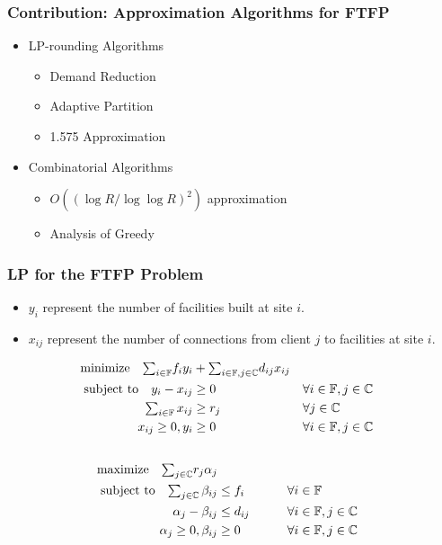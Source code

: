 \documentclass[handout, hyperref, xcolor=dvipsnames]{beamer}
\begin{document}
\begin{frame}
  \frametitle{Contribution: Approximation Algorithms for FTFP}

  \begin{itemize}
  \item LP-rounding Algorithms
    \begin{itemize}
    \item Demand Reduction
    \item Adaptive Partition
    \item 1.575 Approximation
    \end{itemize}
  \item Combinatorial Algorithms
    \begin{itemize}
    \item $O((\log R / \log\log R)^2)$ approximation
    \item Analysis of Greedy
    \end{itemize}
  \end{itemize}
\end{frame}

\begin{frame}
  \frametitle{LP for the FTFP Problem}
  \begin{itemize}
  \item $y_i$ represent the number of facilities built at site $i$.
  \item $x_{ij}$ represent the number of connections from client $j$
    to facilities at site $i$.
  \end{itemize}
  \begin{alignat}{3}
    \notag
    \textrm{minimize}\quad \textstyle{\sum_{i\in \mathbb{F}}}f_iy_i &+ \textstyle{\sum_{i\in \mathbb{F}, j\in \mathbb{C}}}d_{ij}x_{ij}&
    \\ \notag
    \textrm{subject to}\quad y_i - x_{ij} &\geq 0  & &\forall i\in \mathbb{F}, j\in \mathbb{C} 
    \\ \notag
    \textstyle{\sum_{i\in \mathbb{F}} x_{ij}} &\geq r_j & &\forall j\in \mathbb{C}
    \\ \notag
    x_{ij} \geq 0, y_i &\geq 0 & &\forall i\in \mathbb{F}, j\in \mathbb{C} 
    \\ \notag
  \end{alignat}
  \begin{alignat}{3}
    \notag
    \textrm{maximize}\quad \textstyle{\sum_{j\in \mathbb{C}}} r_j\alpha_j&
    \\ \notag
    \textrm{subject to} \quad \textstyle{
      \sum_{j\in \mathbb{C}}\beta_{ij}} &\leq f_i  &\quad\quad			&\forall i \in \mathbb{F}  
    \\ \notag
    \alpha_{j} - \beta_{ij} 	&\leq  d_{ij}       &                 & \forall i\in \mathbb{F}, j\in \mathbb{C} 
    \\ \notag
    \alpha_j \geq 0, \beta_{ij} &\geq 0           &            & \forall i\in \mathbb{F}, j\in \mathbb{C}
  \end{alignat}
\end{frame}
\end{document}
